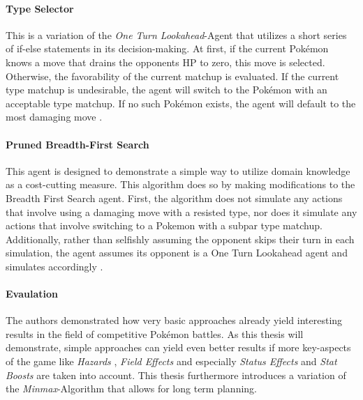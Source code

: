 \paragraph{Type Selector}
This is a variation of the \textit{One Turn Lookahead}-Agent that utilizes a short series of
if-else statements in its decision-making. At first, if the current Pokémon knows a move 
that drains the opponents \ac{HP} to zero, this move is selected. Otherwise, the 
favorability of the current matchup is evaluated. If the current type matchup is 
undesirable, the agent will switch to the Pokémon with an acceptable type matchup. If no
such Pokémon exists, the agent will default to the most damaging move 
\cite{Lee_Togelius_2017}.

\paragraph{Pruned Breadth-First Search}
This agent is designed to demonstrate a simple way to utilize domain knowledge as a cost-cutting 
measure. This algorithm does so by making modifications to the Breadth First Search agent. First, 
the algorithm does not simulate any actions that involve using a damaging move with a resisted type, 
nor does it simulate any actions that involve switching to a Pokemon with a subpar type matchup. 
Additionally, rather than selfishly assuming the opponent skips their turn in each simulation, the 
agent assumes its opponent is a One Turn Lookahead agent and simulates accordingly
\cite{Lee_Togelius_2017}.

\paragraph{Evaulation}
The authors demonstrated how very basic approaches already yield interesting results in the 
field of competitive Pokémon battles. As this thesis will demonstrate, simple approaches can 
yield even better results if more key-aspects of the game like \textit{Hazards} ,
\textit{Field Effects}  and especially \textit{Status Effects}
 and \textit{Stat Boosts} are taken into account. This thesis furthermore
introduces a variation of the \textit{Minmax}-Algorithm that allows for long term planning.

